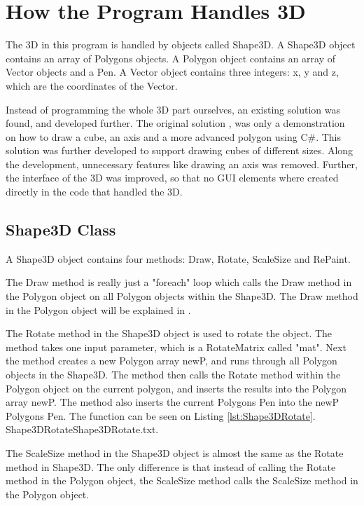 \section{How the Program Handles 3D}
\label{sec:3DHandler}
The 3D in this program is handled by objects called Shape3D. A Shape3D object contains an array of Polygons objects. A Polygon object contains an array of Vector objects and a Pen. A Vector object contains three integers: x, y and z, which are the coordinates of the Vector. 

Instead of programming the whole 3D part ourselves, an existing solution was found, and developed further. The original solution \citep{orgcode}, was only a demonstration on how to draw a cube, an axis and a more advanced polygon using C#. This solution was further developed to support drawing cubes of different sizes. Along the development, unnecessary features like drawing an axis was removed. Further, the interface of the 3D was improved, so that no GUI elements where created directly in the code that handled the 3D.


\subsection{Shape3D Class}
A Shape3D object contains four methods: Draw, Rotate, ScaleSize and RePaint.

The Draw method is really just a "foreach" loop which calls the Draw method in the Polygon object on all Polygon objects within the Shape3D. The Draw method in the Polygon object will be explained in .

The Rotate method in the Shape3D object is used to rotate the object. The method takes one input parameter, which is a RotateMatrix called "mat". Next the method creates a new Polygon array newP, and runs through all Polygon objects in the Shape3D. The method then calls the Rotate method within the Polygon object on the current polygon, and inserts the results into the Polygon array newP. The method also inserts the current Polygons Pen into the newP Polygons Pen. The function can be seen on Listing \ref{lst:Shape3DRotate}.
 {Shape3DRotate}{Shape3DRotate.txt}.

The ScaleSize method in the Shape3D object is almost the same as the Rotate method in Shape3D. The only difference is that instead of calling the Rotate method in the Polygon object, the ScaleSize method calls the ScaleSize method in the Polygon object.

